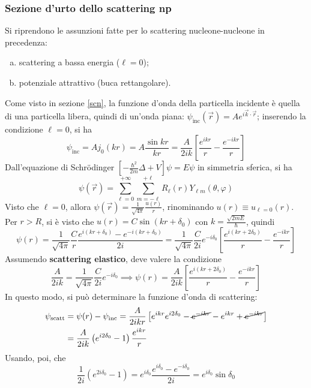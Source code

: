 \documentclass[11pt, a4paper]{scrartcl}
\theoremstyle{style}
\numberwithin{equation}{subsection}
\begin{document}
\subsubsection{Sezione d'urto dello scattering np}
Si riprendono le assunzioni fatte per lo scattering nucleone-nucleone in precedenza:
\begin{enumerate}[(a).]
	\item scattering a bassa energia ($\ell =0$);
	\item potenziale attrattivo (buca rettangolare).
\end{enumerate}
Come visto in sezione \ref{scn}, la funzione d'onda della particella incidente \`e quella di una particella libera, quindi di un'onda piana: $\psi _\text{inc}(\vec{r}) = A e^{i \vec{k}\cdot \vec{r}}$; inserendo la condizione $\ell =0$, si ha 
\begin{equation}
\psi _\text{inc} = A j_0 (kr) = A \frac{\sin kr}{kr}= \frac{A}{2ik}\left[ \frac{e^{ikr}}{r}- \frac{e^{-ikr}}{r} \right] 
\end{equation}
Dall'equazione di Schr\"odinger $\left[ - \frac{\hbar ^2}{2m}\Delta  + V  \right] \psi = E\psi $ in simmetria sferica, si ha 
\[
\psi (\vec{r}) = \sum_{\ell =0}^{+\infty} \sum_{m=-\ell }^{+\ell } R_\ell (r) Y_{\ell m}(\theta ,\varphi )
\] 
Visto che $\ell =0$, allora $\psi (\vec{r}) = \frac{1}{\sqrt{4\pi} }\frac{u(r)}{r}$, rinominando $u(r) \equiv u_{\ell =0}(r)$.
Per $r>R$, si \`e visto che $u(r) = C \sin (kr + \delta _0)$ con $k = \frac{\sqrt{2mE} }{\hbar }$, quindi
\[
\psi (r) = \frac{1}{\sqrt{4\pi} } \frac{C}{r} \frac{e^{i(kr + \delta _0) }- e^{-i(kr+\delta _0)}}{2i} = \frac{1}{\sqrt{4\pi} } \frac{C}{2i} e^{- i \delta _0} \left[ \frac{e^{i(kr + 2 \delta _0)}}{r}- \frac{e^{-ikr}}{r} \right] 
\] 
Assumendo \textbf{scattering elastico}, deve valere la condizione
\[
\frac{A}{2ik} = \frac{1}{\sqrt{4\pi} } \frac{C}{2i}e^{-i\delta _0}\implies  \psi (r) = \frac{A}{2ik } \left[ \frac{e^{i(kr+2\delta _0)}}{r} - \frac{e^{-ikr}}{r} \right] 
\] 
In questo modo, si pu\`o determinare la funzione d'onda di scattering:
\[
\begin{split}
\psi _\text{scatt} &= \psi (r) - \psi _\text{inc} = \frac{A}{2ikr}\left[ e^{ikr}e^{i 2 \delta _0}-\cancel{e^{-ikr}} - e^{ikr} + \cancel{e^{-ikr}}\right] \\
		   &= \frac{A}{2ik}\left(e^{i 2 \delta _0} - 1\right) \frac{e^{ikr}}{r}
\end{split}
\] 
Usando, poi, che
\[
\frac{1}{2i} \left(e^{2 i \delta _0} - 1\right)  = e^{i \delta _0} \frac{e^{i \delta _0 }- e^{- i \delta _0}}{2 i } = e^{i \delta _0} \sin\delta _0
\] 
\end{document}
